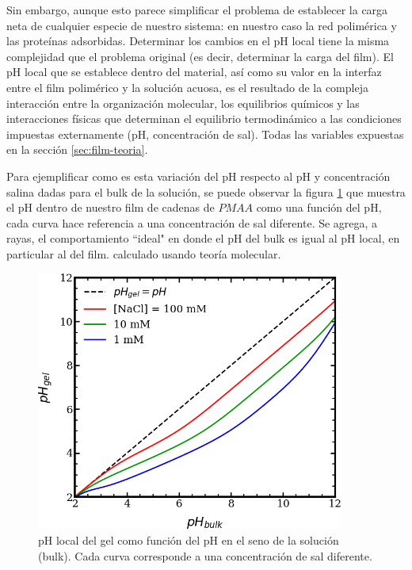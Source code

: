 Sin embargo, aunque esto parece simplificar el problema de establecer la carga neta de cualquier especie de nuestro sistema:
en nuestro caso la red polim\'erica y las prote\'inas adsorbidas. 
Determinar los cambios en el pH local tiene la misma complejidad que el problema original (es decir, determinar la carga del film). El pH local que se establece dentro del material, as\'i como su valor en la interfaz entre el film polim\'erico y la soluci\'on acuosa, es el resultado de la compleja interacci\'on entre la organizaci\'on molecular, los equilibrios qu\'imicos y las interacciones f\'isicas que determinan el equilibrio termodin\'amico a las condiciones impuestas externamente (pH, concentraci\'on de sal).
Todas las variables expuestas en la secci\'on \ref{sec:film-teoria}.

Para ejemplificar como es esta variaci\'on del pH respecto al pH y concentraci\'on salina dadas para el bulk de la soluci\'on, se puede observar la figura \ref{fig:pH-local} que muestra el pH dentro de nuestro film de cadenas de $PMAA$ como una funci\'on del pH, cada curva hace referencia a una concentraci\'on de sal diferente. Se agrega, a rayas, el comportamiento ``ideal" en donde el pH del bulk es igual al pH local, en particular al del film. calculado usando teor\'ia molecular.

\begin{figure}
    \centering
    \includegraphics[width=0.9\textwidth]{Figures/graph-film/pH-local.png}
    \caption{pH local del gel como funci\'on del pH en el seno de la soluci\'on (bulk). Cada curva corresponde a una concentraci\'on de sal diferente.}
    \label{fig:pH-local}
\end{figure}

